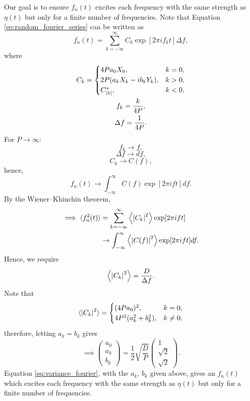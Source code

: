 Our goal is to ensure $f_n(t)$ excites each frequency with the same strength as $\eta(t)$ but only for a finite number of frequencies.
Note that Equation \eqref{eq:random_fourier_series} can be written as
\begin{equation}
    f_n(t) = \sum_{k=-\infty}^\infty C_k\exp[2\pi i f_k t] \Delta f,
\end{equation}
where
\begin{gather}
     C_k = \begin{cases}
    4Pa_0 X_0, & k=0, \\
    2P(a_kX_k - i b_k Y_k), & k>0, \\
    C^*_{\abs{k}}, & k<0,
    \end{cases} \\
    f_k = \frac{k}{4P}, \\
    \Delta f = \frac{1}{4P}.
\end{gather}
For $P\rightarrow\infty$:
\[f_k \rightarrow f,\]
\[\Delta f \rightarrow df,\]
\[C_k \rightarrow C(f),\]
hence,
\begin{equation}
    f_n(t) \rightarrow \int_{-\infty}^\infty C(f) \exp[2\pi i f t] df.
\end{equation}
By the Wiener–Khinchin theorem,
\begin{equation}
    \begin{aligned}
    \implies \langle f_n^2(t)\rangle &= \sum_{k=-\infty}^\infty \left\langle\abs{C_k}^2\right\rangle\exp[2\pi i f t] \\
    &\rightarrow \int_{-\infty}^\infty \left\langle\abs{C(f)}^2\right\rangle \exp[2\pi i f t] d f. \\
    \end{aligned}
\end{equation}
Hence, we require
\begin{equation}
    \left\langle\abs{C_k}^2\right\rangle = \frac{D}{\Delta f}.
\end{equation}
Note that
\begin{equation}
    \langle \abs{C_k}^2 \rangle = \begin{cases}
    (4Pa_0)^2, & k=0, \\
    4P^2(a_k^2 + b_k^2), & k\ne0,
    \end{cases}
\end{equation}
therefore, letting $a_k=b_k$ gives
\begin{equation}
\label{eq:coeffs_ak_bk}
\implies
    \begin{pmatrix}
    a_0 \\
    a_k \\
    b_k
    \end{pmatrix}
    = \frac{1}{2}\sqrt{\frac{D}{P}}
    \begin{pmatrix}
    1 \\
    \sqrt{2} \\
    \sqrt{2}
    \end{pmatrix}.
\end{equation}
Equation \eqref{eq:variance_fourier}, with the $a_k$, $b_k$ given above, gives an  $f_n(t)$ which excites each frequency with the same strength as $\eta(t)$ but only for a finite number of frequencies.

